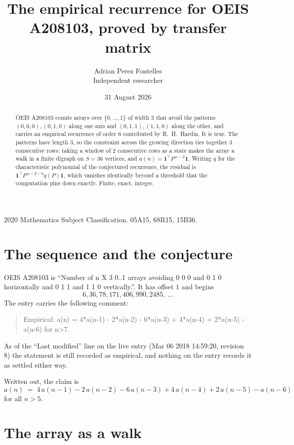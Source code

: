 \documentclass[11pt,a4paper]{article}
\title{The empirical recurrence for OEIS A208103, proved by transfer matrix}
\author{Adrian Perez Fontelles\\ \small Independent researcher}
\date{31 August 2026}
\theoremstyle{plain}
\theoremstyle{definition}
\begin{document}
\maketitle

\begin{abstract}
OEIS A208103 counts arrays over $\{0,\dots,1\}$ of width $3$ that avoid the patterns
$(0,0,0), (0,1,0)$ along one axis and $(0,1,1), (1,1,0)$ along the other, and carries an empirical recurrence of
order $6$ contributed by R.~H.~Hardin. It is true. The patterns have length $3$, so
the constraint across the growing direction ties together $3$ consecutive rows: taking a
window of $2$ consecutive rows as a state makes the array a walk in a finite digraph
on $S=36$ vertices, and $a(n)=\mathbf{1}^{\!\top}P^{\,n-2}\mathbf{1}$. Writing $q$
for the characteristic polynomial of the conjectured recurrence, the residual is
$\mathbf{1}^{\!\top}P^{\,n-2-6}q(P)\mathbf{1}$, which vanishes identically
beyond a threshold that the computation pins down exactly. Finite, exact, integer.
\end{abstract}

\noindent\small 2020 Mathematics Subject Classification. 05A15, 68R15, 15B36.\normalsize

\section{The sequence and the conjecture}

OEIS A208103 is ``Number of n X 3 0..1 arrays avoiding 0 0 0 and 0 1 0 horizontally and 0 1 1 and 1 1 0 vertically.''. It has offset
$1$ and begins
\[
6, 36, 78, 171, 406, 990, 2485,\ \dots
\]
The entry carries the following comment:
\begin{quote}\small
Empirical: a(n) = 4*a(n-1) - 2*a(n-2) - 6*a(n-3) + 4*a(n-4) + 2*a(n-5) - a(n-6) for n>7.
\end{quote}
As of the ``Last modified'' line on the live entry (Mar 06 2018 14:59:20, revision
8) the statement is still recorded as empirical, and nothing on the entry
records it as settled either way.

Written out, the claim is
\begin{equation}\label{eq:conj}
a(n)\;=\;4\,a(n-1) - 2\,a(n-2) - 6\,a(n-3) + 4\,a(n-4) + 2\,a(n-5) - a(n-6)
\end{equation}
for all $n>5$. 

\section{The array as a walk}
\end{document}
